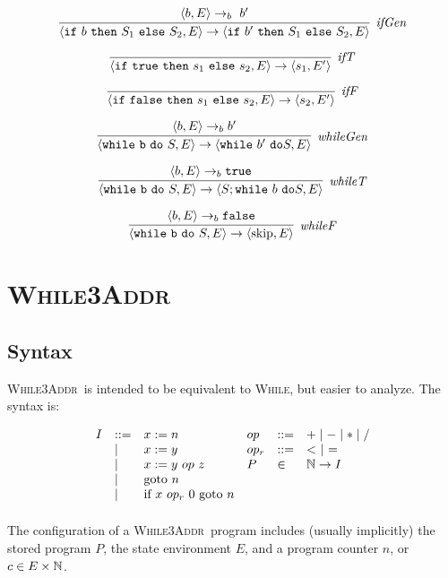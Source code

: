 \documentclass[11pt]{article}
\def\Natural{\mathbb{N}}
\def\While{\textsc{While}}
\def\WhileThAddr{\textsc{While3Addr}}
\begin{document}
\[
\infer[$\textit{ifGen}$]{\langle \mathtt{if}~b~\mathtt{then}~S_1~\mathtt{else}~S_2, E\rangle \rightarrow \langle \mathtt{if}~b'~\mathtt{then}~S_1~\mathtt{else}~S_2, E\rangle}
{ \langle b, E\rangle \rightarrow_b~b'}
\]

\[
\infer[$\textit{ifT}$]{\langle \mathtt{if}~\mathtt{true}~\mathtt{then}~s_1~\mathtt{else}~s_2, E\rangle \rightarrow  \langle s_1,E'\rangle }{}
\]


\[
\infer[$\textit{ifF}$]{\langle \mathtt{if}~\mathtt{false}~\mathtt{then}~s_1~\mathtt{else}~s_2, E\rangle \rightarrow
  \langle s_2,E'\rangle}{}
\]

\[
\infer[$\textit{whileGen}$]{\langle \mathtt{while}~\mathtt{b}~\mathtt{do}~S, E \rangle \rightarrow  \langle \mathtt{while} ~b'~\mathtt{do} S, E \rangle}{\langle b, E \rangle \rightarrow_b b'}
\]

\[
\infer[$\textit{whileT}$]{\langle \mathtt{while}~\mathtt{b}~\mathtt{do}~S, E \rangle \rightarrow  \langle S; \mathtt{while} ~b~\mathtt{do} S, E \rangle}{\langle b, E \rangle \rightarrow_b \mathtt{true}}
\]

\[
\infer[$\textit{whileF}$]{\langle \mathtt{while}~\mathtt{b}~\mathtt{do}~S, E \rangle \rightarrow  \langle \mbox{skip}, E \rangle}{\langle b, E \rangle \rightarrow_b \mathtt{false}}
\]


\section{\WhileThAddr}


\subsection{Syntax}

\WhileThAddr\ is intended to be equivalent to \While, but easier to analyze.  The syntax is:


\[
\begin{array}{llllll}
I & \bnfdef & x := n & op & \bnfdef & + \bnfalt - \bnfalt * \bnfalt / \\
  & \bnfalt & x := y & op_r & \bnfdef & <~ \bnfalt ~=~  \\
  & \bnfalt & x := y ~op~ z & P & \in & \Natural \rightarrow I\\
  & \bnfalt & \mbox{goto}~n \\
  & \bnfalt & \mbox{if}~x~op_r~0~\mbox{goto}~n \\[1ex]
\end{array}
\]


The configuration of a \WhileThAddr\ program includes (usually implicitly) the stored program $P$, the state environment $E$, and a program counter $n$, or $c \in E \cross \Natural$. 
\end{document}
